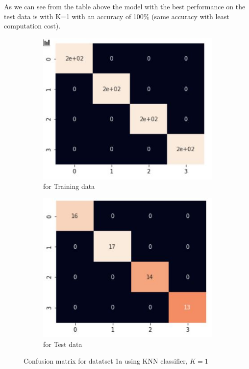 \documentclass[11pt]{article}
\begin{document}
As we can see from the table above the model with the best performance on the test data is with  K=1 with an accuracy of 100\% (same accuracy with least computation cost).
\begin{figure}[h]
\centering
	\begin{subfigure}[b]{0.45\textwidth}
	\centering
	\includegraphics[scale=0.6]{dataset1a_knn_hm_train.jpg}
	\caption{for Training data}
	\label{fig:fig2.2.3.1}
	\end{subfigure}
	\hfill
	\begin{subfigure}[b]{0.45\textwidth}
	\centering
	\includegraphics[scale=0.6]{dataset1a_knn_hm_test.jpg}
	\caption{for Test data}
	\label{fig:fig2.2.3.2}
	\end{subfigure}
\caption{Confusion matrix for datatset 1a using KNN classifier,  $K=1$}
\label{fig:fig1.2.1}
\end{figure}
\end{document}
